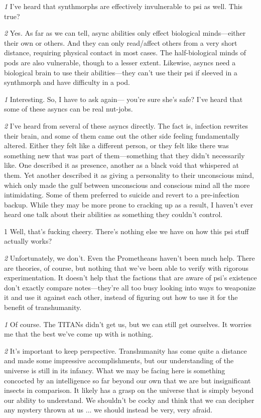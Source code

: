 \textit{\textit{1}} I’ve heard that synthmorphs are effectively invulnerable to psi as well. This true? 

\textit{\textit{2}} Yes. As far as we can tell, async abilities only effect biological minds—either their own or others. And they can only read/affect others from a very short distance, requiring physical contact in most cases. The half-biological minds of pods are also vulnerable, though to a lesser extent. Likewise, asyncs need a biological brain to use their abilities—they can’t use their psi if sleeved in a synthmorph and have difficulty in a pod. 

\textit{\textit{1}} Interesting. So, I have to ask again— you’re sure she’s safe? I’ve heard that some of these asyncs can be real nut-jobs. 

\textit{\textit{2}} I’ve heard from several of these asyncs directly. The fact is, infection rewrites their brain, and some of them came out the other side feeling fundamentally altered. Either they felt like a different person, or they felt like there was something new that was part of them—something that they didn’t necessarily like. One described it as presence, another as a black void that whispered at them. Yet another described it as giving a personality to their unconscious mind, which only made the gulf between unconscious and conscious mind all the more intimidating. Some of them preferred to suicide and revert to a pre-infection backup. While they may be more prone to cracking up as a result, I haven’t ever heard one talk about their abilities as something they couldn’t control. 

1 Well, that’s fucking cheery. There’s nothing else we have on how this psi stuff actually works? 

\textit{\textit{2}} Unfortunately, we don’t. Even the Prometheans haven’t been much help. There are theories, of course, but nothing that we’ve been able to verify with rigorous experimentation. It doesn’t help that the factions that are aware of psi’s existence don’t exactly compare notes—they’re all too busy looking into ways to weaponize it and use it against each other, instead of figuring out how to use it for the benefit of transhumanity. 

\textit{\textit{1}} Of course. The TITANs didn’t get us, but we can still get ourselves. It worries me that the best we’ve come up with is nothing. 

\textit{\textit{2}} It’s important to keep perspective. Transhumanity has come quite a distance and made some impressive accomplishments, but our understanding of the universe is still in its infancy. What we may be facing here is something concocted by an intelligence so far beyond our own that we are but insignificant insects in comparison. It likely has a grasp on the universe that is simply beyond our ability to understand. We shouldn’t be cocky and think that we can decipher any mystery thrown at us ... we should instead be very, very afraid. 

